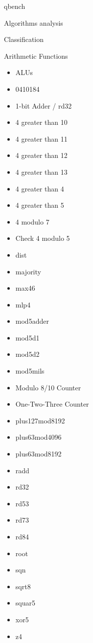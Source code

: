 \documentclass[11pt]{beamer}
\begin{document}
\begin{frame}[fragile,label={sec:org639c711}]{qbench}
\begin{block}{Algorithms analysis}
\begin{block}{Classification}
\begin{block}{Arithmetic Functions}
\begin{itemize}
\item ALUs
\item 0410184
\item 1-bit Adder / rd32
\item 4 greater than 10
\item 4 greater than 11
\item 4 greater than 12
\item 4 greater than 13
\item 4 greater than 4
\item 4 greater than 5
\item 4 modulo 7
\item Check 4 modulo 5
\item dist
\item majority
\item max46
\item mlp4
\item mod5adder
\item mod5d1
\item mod5d2
\item mod5mils
\item Modulo 8/10 Counter
\item One-Two-Three Counter
\item plus127mod8192
\item plus63mod4096
\item plus63mod8192
\item radd
\item rd32
\item rd53
\item rd73
\item rd84
\item root
\item sqn
\item sqrt8
\item squar5
\item xor5
\item z4
\end{itemize}
\end{block}


\end{block}
\end{block}
\end{frame}
\end{document}
